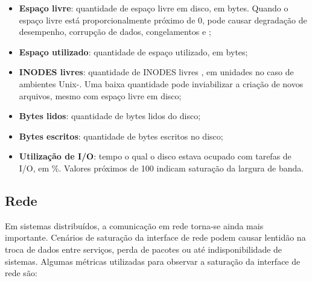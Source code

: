 \begin{itemize}
\item \textbf{Espaço livre}: quantidade de espaço livre em disco, em bytes. Quando o espaço livre está proporcionalmente próximo de 0, pode causar degradação de desempenho, corrupção de dados, congelamentos e ;

\item \textbf{Espaço utilizado}: quantidade de espaço utilizado, em bytes;

\item \textbf{INODES livres}: quantidade de INODES livres \citep{inodes2025}, em unidades no caso de ambientes Unix-. Uma baixa quantidade pode inviabilizar a criação de novos arquivos, mesmo com espaço livre em disco;

\item \textbf{Bytes lidos}: quantidade de bytes lidos do disco;

\item \textbf{Bytes escritos}: quantidade de bytes escritos no disco;

\item \textbf{Utilização de I/O}: tempo o qual o disco estava ocupado com tarefas de I/O, em \%. Valores próximos de 100 indicam saturação da largura de banda.
\end{itemize}

\subsection{Rede}
\label{subsection:Rede}

Em sistemas distribuídos, a comunicação em rede torna-se ainda mais importante. Cenários de saturação da interface de rede \citep{netmetrics2025} podem causar lentidão na troca de dados entre serviços, perda de pacotes ou até indisponibilidade de sistemas. Algumas métricas utilizadas para observar a saturação da interface de rede são:

